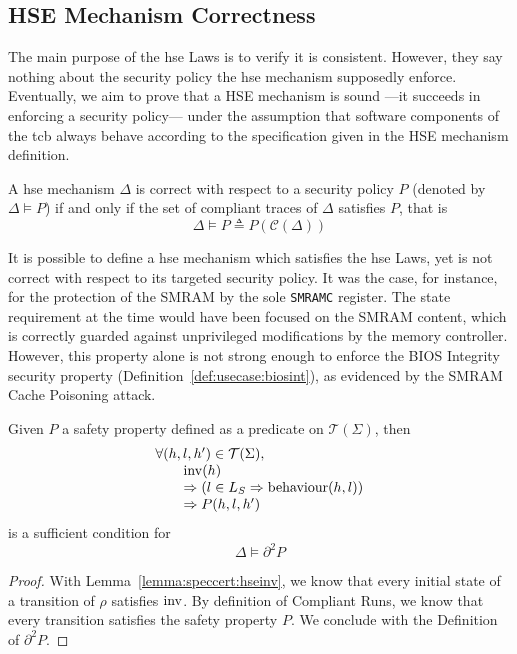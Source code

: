 \subsection{HSE Mechanism Correctness}
\label{subsec:speccert:correct}

The main purpose of the \ac{hse} Laws is to verify it is consistent.
%
However, they say nothing about the security policy the \ac{hse} mechanism
supposedly enforce.
%
Eventually, we aim to prove that a HSE mechanism is sound ---it succeeds in
enforcing a security policy--- under the assumption that software components of
the \ac{tcb} always behave according to the specification given in the HSE
mechanism definition.

\begin{definition}
  A \ac{hse} mechanism $\Delta$ is correct with respect to a security policy $P$
  (denoted by $\Delta \models P$) if and only if the set of compliant traces of
  $\Delta$ satisfies $P$, that is
  \[
    \Delta \models P \triangleq P(\mathcal{C}(\Delta))
  \]
\end{definition}

It is possible to define a \ac{hse} mechanism which satisfies the \ac{hse} Laws,
yet is not correct with respect to its targeted security policy.
%
It was the case, for instance, for the protection of the SMRAM by the sole
\texttt{SMRAMC} register.
%
The state requirement at the time would have been focused on the SMRAM content,
which is correctly guarded against unprivileged modifications by the memory
controller.
%
However, this property alone is not strong enough to enforce the BIOS Integrity
security property (Definition~\ref{def:usecase:biosint}), as evidenced by the
SMRAM Cache Poisoning attack.

\begin{theorem}
  \label{theorem:speccert:correcthse}
  Given $P$ a safety property defined as a predicate on $\mathcal{T}(\Sigma)$,
  then
  \[
    \begin{array}{l}
      \forall (h, l, h') \in \mathcal{T}(\Sigma), \\
      \qquad \mathrm{inv}(h) \\
      \qquad \Rightarrow (l \in L_{S} \Rightarrow \mathrm{behaviour}(h, l))\\
      \qquad \Rightarrow P(h, l, h')
    \end{array}
  \]
  is a sufficient condition for
  \[
    \Delta \models \partial^2 P
  \]

  \begin{proof}
    With Lemma~\ref{lemma:speccert:hseinv}, we know that every initial state of
    a transition of $\rho$ satisfies $\mathrm{inv}$.
    By definition of Compliant Runs, we know that every transition satisfies the safety property $P$.
    We conclude with the Definition of $\partial^2 P$.
  \end{proof}
\end{theorem}


